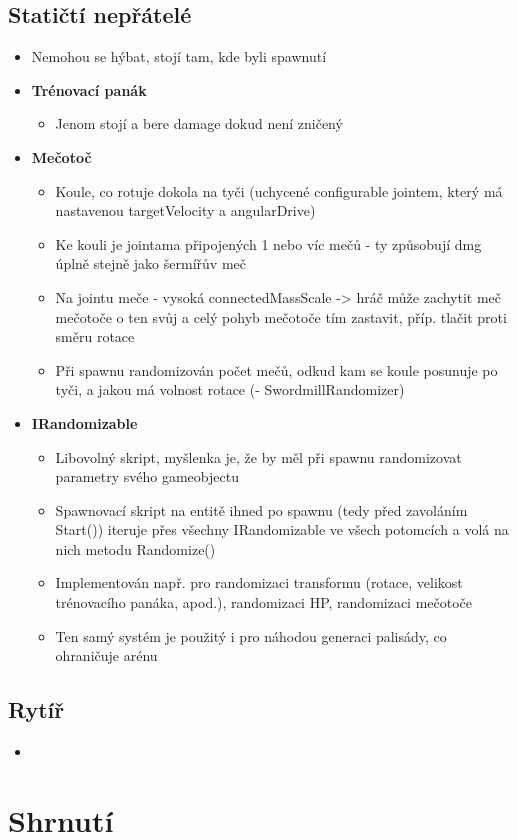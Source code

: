 \subsection{Statičtí nepřátelé}
\begin{itemize}
  \item Nemohou se hýbat, stojí tam, kde byli spawnutí
  \item \textbf{Trénovací panák}
    \begin{itemize}
      \item Jenom stojí a bere damage dokud není zničený
    \end{itemize}
  \item \textbf{Mečotoč}
    \begin{itemize}
      \item Koule, co rotuje dokola na tyči (uchycené configurable jointem, který má nastavenou targetVelocity a angularDrive)
      \item Ke kouli je jointama připojených 1 nebo víc mečů - ty způsobují dmg úplně stejně jako šermířův meč
      \item Na jointu meče - vysoká connectedMassScale -> hráč může zachytit meč mečotoče o ten svůj a celý pohyb mečotoče tím zastavit, příp. tlačit proti směru rotace
      \item Při spawnu randomizován počet mečů, odkud kam se koule posunuje po tyči, a jakou má volnost rotace (- SwordmillRandomizer)
    \end{itemize}
  \item \textbf{IRandomizable}
  \begin{itemize}
    \item Libovolný skript, myšlenka je, že by měl při spawnu randomizovat parametry svého gameobjectu
    \item Spawnovací skript na entitě ihned po spawnu (tedy před zavoláním Start()) iteruje přes všechny IRandomizable ve všech potomcích a volá na nich metodu Randomize()
    \item Implementován např. pro randomizaci transformu (rotace, velikost trénovacího panáka, apod.), randomizaci HP, randomizaci mečotoče
    \item Ten samý systém je použitý i pro náhodou generaci palisády, co ohraničuje arénu
  \end{itemize}
\end{itemize}


\subsection{Rytíř} \label{knightEnemySubsection}
\begin{itemize}
  \item 
\end{itemize}


\section{Shrnutí}
